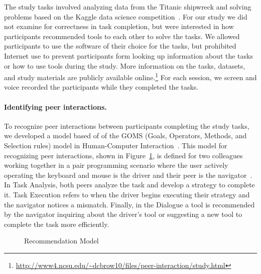 The study tasks involved analyzing data from the Titanic shipwreck and solving problems based on the Kaggle data science competition~\cite{KaggleTitanic}. For our study we did not examine for correctness in task completion, but were interested in how participants recommended tools to each other to solve the tasks. We allowed participants to use the software of their choice for the tasks, but prohibited Internet use to prevent participants form looking up information about the tasks or how to use tools during the study. More information on the tasks, datasets, and study materials are publicly available online.\footnote{\url{http://www4.ncsu.edu/~dcbrow10/files/peer-interaction/study.html}} For each session, we screen and voice recorded the participants while they completed the tasks.

\paragraph{Identifying peer interactions.}

To recognize peer interactions between participants completing the study tasks, we developed a model based of of the GOMS (Goals, Operators, Methods, and Selection rules) model in Human-Computer Interaction~\cite{diaper2003handbook}. This model for recognizing peer interactions, shown in Figure~\ref{fig:rec-model}, is defined for two colleagues working together in a pair programming scenario where the user actively operating the keyboard and mouse is the driver and their peer is the navigator~\cite{WilliamsPairProgramming}. In Task Analysis, both peers analyze the task and develop a strategy to complete it. Task Execution refers to when the driver begins executing their strategy and the navigator notices a mismatch. Finally, in the Dialogue a tool is recommended by the navigator inquiring about the driver's tool or suggesting a new tool to complete the task more efficiently.

\noindent
\begin{figure}
\centering
{}
\caption{Recommendation Model}
\label{fig:rec-model}
\end{figure}

